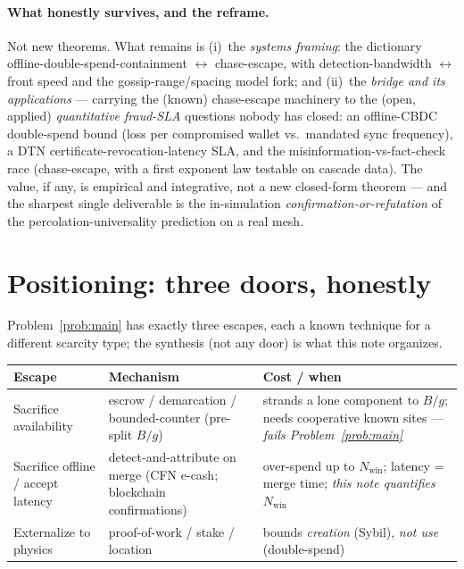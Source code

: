 \documentclass[11pt]{article}
\theoremstyle{plain}
\theoremstyle{definition}
\newcommand{\Nwin}{N_{\mathrm{win}}}
\begin{document}
\paragraph{What honestly survives, and the reframe.} Not new theorems. What remains
is (i)~the \emph{systems framing}: the dictionary offline-double-spend-containment
$\leftrightarrow$ chase-escape, with detection-bandwidth $\leftrightarrow$ front
speed and the gossip-range/spacing model fork; and (ii)~the \emph{bridge and its
applications} --- carrying the (known) chase-escape machinery to the (open, applied)
\emph{quantitative fraud-SLA} questions nobody has closed: an offline-CBDC
double-spend bound (loss per compromised wallet vs.\ mandated sync frequency), a
DTN certificate-revocation-latency SLA, and the misinformation-vs-fact-check race
(chase-escape, with a first exponent law testable on cascade data). The value, if
any, is empirical and integrative, not a new closed-form theorem --- and the
sharpest single deliverable is the in-simulation \emph{confirmation-or-refutation}
of the percolation-universality prediction on a real mesh.

\section{Positioning: three doors, honestly}\label{sec:doors}

Problem~\ref{prob:main} has exactly three escapes, each a known technique for a
different scarcity type; the synthesis (not any door) is what this note organizes.

\begin{center}
\begin{tabular}{@{}p{3.2cm}p{4.6cm}p{4.8cm}@{}}
\toprule
\textbf{Escape} & \textbf{Mechanism} & \textbf{Cost / when} \\
\midrule
Sacrifice availability & escrow / demarcation / bounded-counter (pre-split $B/g$)~\cite{ONeil1986Escrow,Barbara1994Demarcation,Balegas2015BoundedCounter} & strands a lone component to $B/g$; needs cooperative known sites --- \emph{fails Problem~\ref{prob:main}} \\
Sacrifice offline / accept latency & detect-and-attribute on merge (CFN e-cash; blockchain confirmations)~\cite{ChaumFiatNaor1988,PassSeemanShelat2017,Rosenfeld2014Hashrate} & over-spend up to $\Nwin$; latency = merge time; \emph{this note quantifies $\Nwin$} \\
Externalize to physics & proof-of-work / stake / location~\cite{Back2002Hashcash,Douceur2002Sybil} & bounds \emph{creation} (Sybil), \emph{not use} (double-spend) \\
\bottomrule
\end{tabular}
\end{center}
\end{document}
